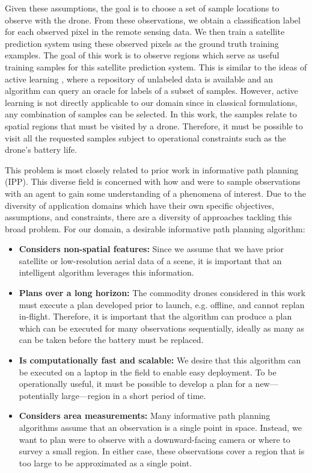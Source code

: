 Given these assumptions, the goal is to choose a set of sample locations to observe with the drone. From these observations, we obtain a classification label for each observed pixel in the remote sensing data. We then train a satellite prediction system using these observed pixels as the ground truth training examples. The goal of this work is to observe regions which serve as useful training samples for this satellite prediction system. This is similar to the ideas of active learning \cite{Active learning}, where a repository of unlabeled data is available and an algorithm can query an oracle for labels of a subset of samples. However, active learning is not directly applicable to our domain since in classical formulations, any combination of samples can be selected. In this work, the samples relate to spatial regions that must be visited by a drone. Therefore, it must be possible to visit all the requested samples subject to operational constraints such as the drone's battery life.

This problem is most closely related to prior work in informative path planning (IPP). This diverse field is concerned with how and were to sample observations with an agent to gain some understanding of a phenomena of interest. Due to the diversity of application domains which have their own specific objectives, assumptions, and constraints, there are a diversity of approaches tackling this broad problem. For our domain, a desirable informative path planning algorithm:

\begin{itemize}
    \item \textbf{Considers non-spatial features:} Since we assume that we have prior satellite or low-resolution aerial data of a scene, it is important that an intelligent algorithm leverages this information.
    \item \textbf{Plans over a long horizon:} The commodity drones considered in this work must execute a plan developed prior to launch, e.g. offline, and cannot replan in-flight.
    Therefore, it is important that the algorithm can produce a plan which can be executed for many observations sequentially, ideally as many as can be taken before the battery must be replaced. 
    \item \textbf{Is computationally fast and scalable:} We desire that this algorithm can be executed on a laptop in the field to enable easy deployment.
    To be operationally useful, it must be possible to develop a plan for a new---potentially large---region in a short period of time.
    \item \textbf{Considers area measurements:} Many informative path planning algorithms assume that an observation is a single point in space. Instead, we want to plan were to observe with a downward-facing camera or where to survey a small region. In either case, these observations cover a region that is too large to be approximated as a single point.
\end{itemize}



